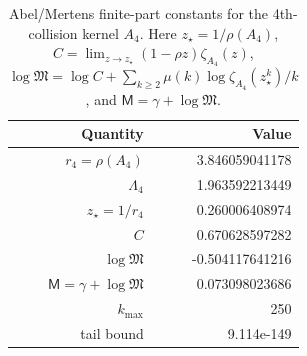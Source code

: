 \begin{table}[H]
\centering
\scriptsize
\setlength{\tabcolsep}{6pt}
\caption{Abel/Mertens finite-part constants for the 4th-collision kernel $A_4$. Here $z_\star=1/\rho(A_4)$, $C=\lim_{z\to z_\star}(1-\rho z)\zeta_{A_4}(z)$, $\log\mathfrak{M}=\log C+\sum_{k\ge2}\mu(k)\log\zeta_{A_4}(z_\star^k)/k$, and $\mathsf{M}=\gamma+\log\mathfrak{M}$.}
\label{tab:collision_kernel_A4_finite_part}
\begin{tabular}{r r}
\toprule
Quantity & Value\\
\midrule
$r_4=\rho(A_4)$ & 3.846059041178\\
$\Lambda_4$ & 1.963592213449\\
$z_\star=1/r_4$ & 0.260006408974\\
$C$ & 0.670628597282\\
$\log\mathfrak{M}$ & -0.504117641216\\
$\mathsf{M}=\gamma+\log\mathfrak{M}$ & 0.073098023686\\
$k_{\max}$ & 250\\
tail bound & 9.114e-149\\
\bottomrule
\end{tabular}
\end{table}
